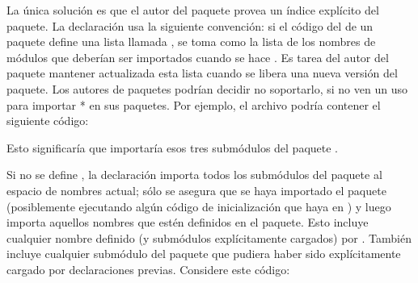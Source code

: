\documentclass[a4,10pt,spanish]{sphinxmanual}
\begin{document}
\sphinxAtStartPar
La única solución es que el autor del paquete provea un índice explícito del paquete.  La declaración  usa la siguiente convención: si el código del  de un paquete define una lista llamada , se toma como la lista de los nombres de módulos que deberían ser importados cuando se hace .  Es tarea del autor del paquete mantener actualizada esta lista cuando se libera una nueva versión del paquete.  Los autores de paquetes podrían decidir no soportarlo, si no ven un uso para importar * en sus paquetes.  Por ejemplo, el archivo  podría contener el siguiente código:

\begin{sphinxVerbatim}[commandchars=\\\{\}]
  \PYG{p}{[}  \PYG{p}{]}
\end{sphinxVerbatim}

\sphinxAtStartPar
Esto significaría que  importaría esos tres submódulos del paquete .

\sphinxAtStartPar
Si no se define , la declaración   importa todos los submódulos del paquete  al espacio de nombres actual; sólo se asegura que se haya importado el paquete  (posiblemente ejecutando algún código de inicialización que haya en ) y luego importa aquellos nombres que estén definidos en el paquete.  Esto incluye cualquier nombre definido (y submódulos explícitamente cargados) por .  También incluye cualquier submódulo del paquete que pudiera haber sido explícitamente cargado por declaraciones  previas.  Considere este código:

\begin{sphinxVerbatim}[commandchars=\\\{\}]
 
 
   
\end{sphinxVerbatim}
\end{document}
